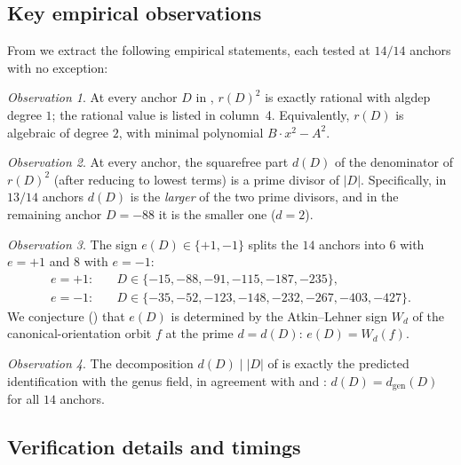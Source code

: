 \documentclass[11pt]{amsart}
\theoremstyle{definition}
\theoremstyle{remark}
\newtheorem*{observation}{Observation}
\begin{document}
\subsection{Key empirical observations}\label{ssec:obs}

From  we extract the following empirical statements,
each tested at \(14/14\) anchors with no exception:

\begin{observation}\label{obs:14-exact}
At every anchor \(D\) in , \(r(D)^{2}\) is exactly
rational with \textsf{algdep} degree \(1\); the rational value is
listed in column~4. Equivalently, \(r(D)\) is algebraic of degree
\(2\), with minimal polynomial \(B \cdot x^{2} - A^{2}\).
\end{observation}

\begin{observation}\label{obs:d-divides}
At every anchor, the squarefree part \(d(D)\) of the denominator of
\(r(D)^{2}\) (after reducing to lowest terms) is a prime divisor of
\(|D|\). Specifically, in \(13/14\) anchors \(d(D)\) is the
\emph{larger} of the two prime divisors, and in the remaining
anchor \(D = -88\) it is the smaller one (\(d = 2\)).
\end{observation}

\begin{observation}\label{obs:e-split}
The sign \(e(D) \in \{+1, -1\}\) splits the \(14\) anchors into
\(6\) with \(e = +1\) and \(8\) with \(e = -1\):
\begin{align*}
   e = +1 : & \quad D \in \{-15, -88, -91, -115, -187, -235\}, \\
   e = -1 : & \quad D \in \{-35, -52, -123, -148, -232, -267, -403, -427\}.
\end{align*}
We conjecture () that \(e(D)\) is determined by
the Atkin--Lehner sign \(W_{d}\) of the canonical-orientation orbit
\(f\) at the prime \(d = d(D)\): \(e(D) = W_{d}(f)\).
\end{observation}

\begin{observation}\label{obs:gauss-fits}
The decomposition \(d(D) \mid |D|\) of  is
exactly the predicted identification with the genus field, in
agreement with  and :
\(d(D) = d_{\mathrm{gen}}(D)\) for all \(14\) anchors.
\end{observation}

\subsection{Verification details and timings}\label{ssec:timings}
\end{document}
